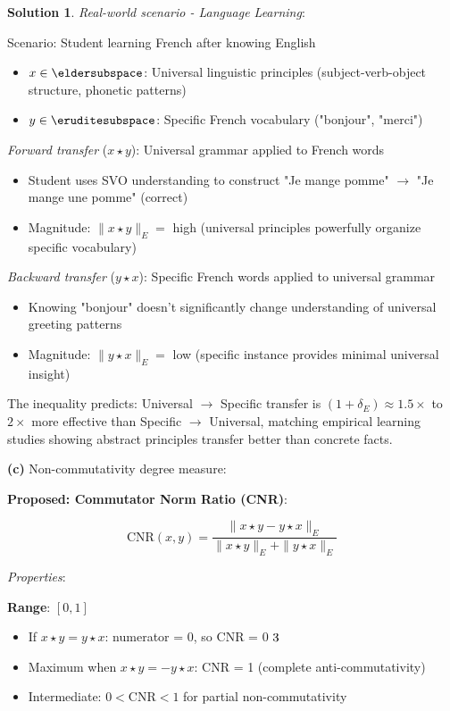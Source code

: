 \documentclass[12pt,a4paper]{book}
\newcommand{\checkmark}{\ding{51}}
\theoremstyle{definition}
\newtheorem{solution}{Solution}[section]
\theoremstyle{remark}
\begin{document}
\begin{solution}
\textit{Real-world scenario - Language Learning}:

Scenario: Student learning French after knowing English

\begin{itemize}
\item $x \in \eldersubspace$: Universal linguistic principles (subject-verb-object structure, phonetic patterns)
\item $y \in \eruditesubspace$: Specific French vocabulary ("bonjour", "merci")
\end{itemize}

\textit{Forward transfer} ($x \star y$): Universal grammar applied to French words
\begin{itemize}
\item Student uses SVO understanding to construct "Je mange pomme" $\to$ "Je mange une pomme" (correct)
\item Magnitude: $\|x \star y\|_E = $ high (universal principles powerfully organize specific vocabulary)
\end{itemize}

\textit{Backward transfer} ($y \star x$): Specific French words applied to universal grammar
\begin{itemize}
\item Knowing "bonjour" doesn't significantly change understanding of universal greeting patterns
\item Magnitude: $\|y \star x\|_E = $ low (specific instance provides minimal universal insight)
\end{itemize}

The inequality predicts: Universal $\to$ Specific transfer is $(1+\delta_E) \approx 1.5\times$ to $2\times$ more effective than Specific $\to$ Universal, matching empirical learning studies showing abstract principles transfer better than concrete facts.

\textbf{(c)} Non-commutativity degree measure:

\textbf{Proposed: Commutator Norm Ratio (CNR)}:

$$\text{CNR}(x, y) = \frac{\|x \star y - y \star x\|_E}{\|x \star y\|_E + \|y \star x\|_E}$$

\textit{Properties}:

\textbf{Range}: $[0, 1]$
\begin{itemize}
\item If $x \star y = y \star x$: numerator = 0, so CNR = 0 $\checkmark$
\item Maximum when $x \star y = -y \star x$: CNR = 1 (complete anti-commutativity)
\item Intermediate: $0 < \text{CNR} < 1$ for partial non-commutativity
\end{itemize}


\end{solution}
\end{document}
